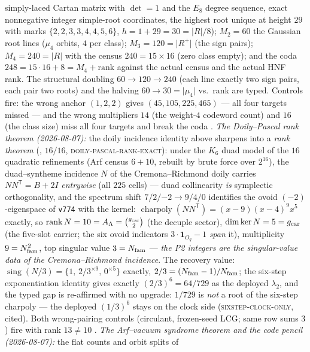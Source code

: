 simply-laced Cartan matrix with $\det = 1$ and the $E_8$ degree
sequence, exact nonnegative integer simple-root coordinates, the
highest root unique at height $29$ with marks
$\{2,2,3,3,4,4,5,6\}$, $h = 1 + 29 = 30 = \lvert R\rvert/8$);
$M_2 = 60$ the Gaussian root lines ($\mu_4$ orbits, $4$ per
class); $M_3 = 120 = \lvert R^+\rvert$ (the sign pairs);
$M_4 = 240 = \lvert R\rvert$ with the census $240 = 15\times16$
(zero class empty); and the coda $248 = 15\cdot16 + 8 = M_4 +
\mathrm{rank}$ against the actual census and the actual HNF rank.
The structural doubling $60 \to 120 \to 240$ (each line exactly
two sign pairs, each pair two roots) and the halving $60 \to 30 =
\lvert\mu_4\rvert$ vs.\ rank are typed.  Controls fire: the wrong
anchor $(1,2,2)$ gives $(45, 105, 225, 465)$ --- all four targets
missed --- and the wrong multipliers $14$ (the weight-$4$
codeword count) and $16$ (the class size) miss all four targets
and break the coda \mE.
\emph{The Doily--Pascal rank theorem (2026-08-07):} the doily
incidence identity above sharpens into a \emph{rank theorem}
(, $16/16$,
\textsc{doily-pascal-rank-exact}): under the $K_6$ duad model of
the $16$ quadratic refinements (Arf census $6 + 10$, rebuilt by
brute force over $2^{16}$), the duad--syntheme incidence $N$ of
the Cremona--Richmond doily carries $NN^{\mathsf T} = B + 2I$
\emph{entrywise} (all $225$ cells) --- duad collinearity
\emph{is} symplectic orthogonality, and the spectrum shift
$7/2/{-2} \to 9/4/0$ identifies the ovoid $(-2)$-eigenspace of
\texttt{v774} with the kernel: $\operatorname{charpoly}
(NN^{\mathsf T}) = (x-9)(x-4)^9x^5$ exactly, so
$\operatorname{rank} N = 10 = A_\Lambda = \binom{g_{\mathrm{car}}}{2}$ (the
decuple sector), $\dim\ker N = 5 = g_{\mathrm{car}}$ (the five-slot
carrier; the six ovoid indicators $3\cdot\mathbf 1_{O_q} - 1$
\emph{span} it), multiplicity $9 = N_{\mathrm{fam}}^2$, top singular value
$3 = N_{\mathrm{fam}}$ --- \emph{the P2 integers are the singular-value
data of the Cremona--Richmond incidence}.  The recovery value:
$\operatorname{sing}(N/3) = \{1,\, 2/3^{\times9},\,
0^{\times5}\}$ exactly, $2/3 = (N_{\mathrm{fam}} - 1)/N_{\mathrm{fam}}$; the six-step
exponentiation identity gives exactly $(2/3)^6 = 64/729$ as the
deployed $\lambda_2$, and the typed gap is re-affirmed with no
upgrade: $1/729$ is \emph{not} a root of the six-step charpoly
--- the deployed $(1/3)^6$ stays on the clock side
(\textsc{sixstep-clock-only}, cited).  Both wrong-pairing
controls (circulant, frozen-seed LCG; same row sums $3$) fire
with rank $13 \ne 10$ \mE.
\emph{The Arf--vacuum syndrome theorem and the code pencil
(2026-08-07):} the flat counts and orbit splits of
